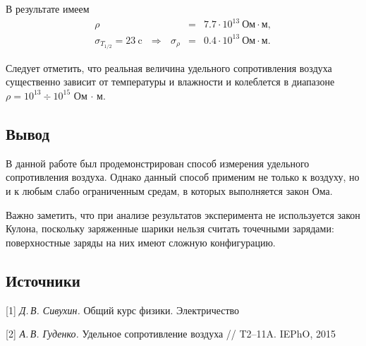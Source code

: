 \documentclass[a4paper, 12pt]{article}
\begin{document}
\bigskip

В результате имеем
\begin{eqnarray}
\rho &=& 7.7 \cdot 10^{13}~\text{Ом} \cdot \text{м},\\
\sigma_{T_{1/2}} = 23~\text{c} ~~~\Rightarrow~~~ \sigma_{\rho} &=& 0.4\cdot 10^{13}~\text{Ом} \cdot \text{м}.
\end{eqnarray}

Следует отметить, что реальная величина удельного сопротивления воздуха существенно зависит от температуры и влажности и колеблется в диапазоне $\rho = 10^{13} \div 10^{15}$ Ом $\cdot$ м. 

\subsection*{Вывод}
В данной работе был продемонстрирован способ измерения удельного сопротивления воздуха. Однако данный способ применим не только к воздуху, но и к любым слабо ограниченным средам, в которых выполняется закон Ома.

Важно заметить, что при анализе результатов эксперимента не используется закон Кулона, поскольку заряженные шарики нельзя считать точечными зарядами: поверхностные заряды на них имеют сложную конфигурацию. 

\subsection*{Источники}

[1] \textit{Д.\,В. Сивухин.} Общий курс физики. Электричество

\vspace{-.7\parskip}
[2] \textit{А.\,В. Гуденко.} Удельное сопротивление воздуха /\!/ T2--11A. IEPhO, 2015
\end{document}
